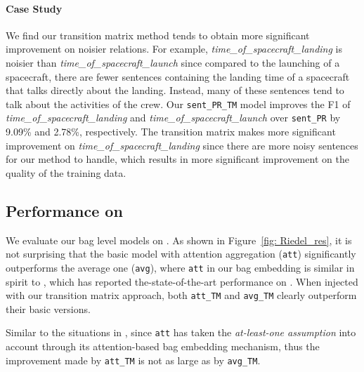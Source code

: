 \paragraph{Case Study}
We find our transition matrix method tends to obtain more significant improvement on noisier relations. For example, \textit{time\_of\_spacecraft\_landing} is noisier than \textit{time\_of\_spacecraft\_launch} since compared to the launching of a spacecraft, there are fewer sentences containing the landing time of a spacecraft that talks directly about the landing. Instead, many of these sentences tend to talk about the activities of the crew. Our \texttt{sent\_PR\_TM} model improves the F1 of \textit{time\_of\_spacecraft\_landing} and \textit{time\_of\_spacecraft\_launch} over \texttt{sent\_PR} by 9.09\% and 2.78\%, respectively. 
The transition matrix makes more significant improvement on \textit{time\_of\_spacecraft\_landing} since there are more noisy sentences for our method to handle, which results in more significant improvement on the quality of the training data.


\subsection{Performance on \EntityRE}
We evaluate our bag level models on \EntityRE.
As shown in Figure~\ref{fig: Riedel_res}, it is not surprising that the basic model with attention aggregation (\texttt{att}) significantly outperforms the average one (\texttt{avg}), where \texttt{att} in our bag embedding is similar in spirit to \cite{lin2016neural},
which has reported the-state-of-the-art performance on \EntityRE.
When injected with our transition matrix approach,  both \texttt{att\_TM} and \texttt{avg\_TM} clearly outperform their basic versions.

Similar to the situations in \TimeRE, since \texttt{att} has taken the \textit{at-least-one assumption} into account through its attention-based bag embedding mechanism, thus the improvement made by \texttt{att\_TM} is not as large as by \texttt{avg\_TM}.

